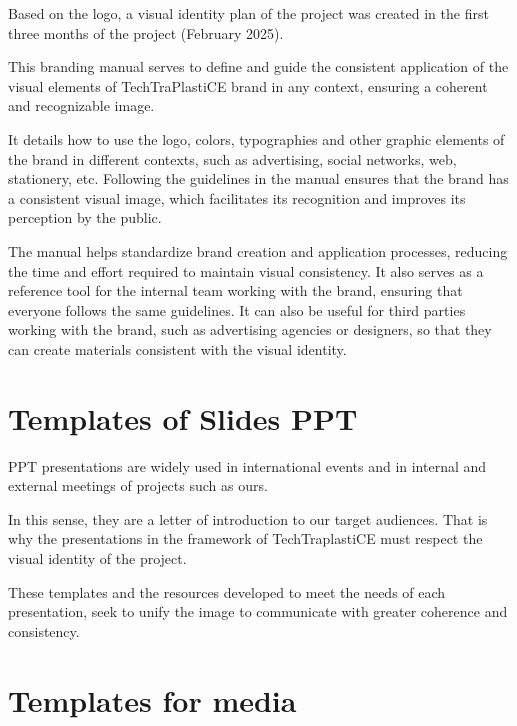 \documentclass[
  12pt,
  oneside]{book}
\begin{document}
Based on the logo, a visual identity plan of the project was created in
the first three months of the project (February 2025).

This branding manual serves to define and guide the consistent
application of the visual elements of TechTraPlastiCE brand in any
context, ensuring a coherent and recognizable image.

It details how to use the logo, colors, typographies and other graphic
elements of the brand in different contexts, such as advertising, social
networks, web, stationery, etc. Following the guidelines in the manual
ensures that the brand has a consistent visual image, which facilitates
its recognition and improves its perception by the public.

The manual helps standardize brand creation and application processes,
reducing the time and effort required to maintain visual consistency. It
also serves as a reference tool for the internal team working with the
brand, ensuring that everyone follows the same guidelines. It can also
be useful for third parties working with the brand, such as advertising
agencies or designers, so that they can create materials consistent with
the visual identity.



\section{Templates of Slides PPT}\label{templates-of-slides-ppt}

PPT presentations are widely used in international events and in
internal and external meetings of projects such as ours.

In this sense, they are a letter of introduction to our target
audiences. That is why the presentations in the framework of
TechTraplastiCE must respect the visual identity of the project.

These templates and the resources developed to meet the needs of each
presentation, seek to unify the image to communicate with greater
coherence and consistency.



\section{Templates for media}\label{templates-for-media}
\end{document}

